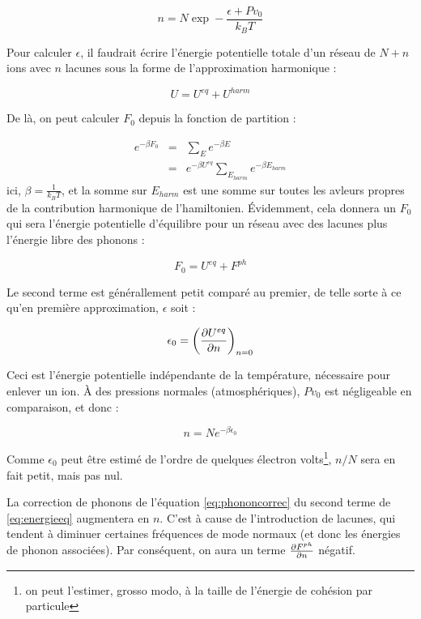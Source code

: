 \begin{equation}
    n = N \exp - \frac{\epsilon + P v_0}{k_B T}
    \label{eq:minimizgibbs}
\end{equation}

Pour calculer $\epsilon$, il faudrait écrire l'énergie potentielle totale d'un réseau de $N+n$ ions avec $n$ lacunes sous la forme de l'approximation harmonique :

\begin{equation}
    U = U^{eq} + U^{harm}
\end{equation}

De là, on peut calculer $F_0$ depuis la fonction de partition :

\begin{eqnarray}
    e^{-\beta F_0} & = & \sum_E e^{-\beta E}\\
    & = & e^{-\beta U^{eq}} \sum_{E_{harm}} e^{-\beta E_{harm}}
\end{eqnarray}
ici, $\beta = \frac{1}{k_B T}$, et la somme sur $E_{harm}$ est une somme sur toutes les avleurs propres de la contribution harmonique de l'hamiltonien. Évidemment, cela donnera un $F_0$ qui sera l'énergie potentielle d'équilibre pour un réseau avec des lacunes plus l'énergie libre des phonons :

\begin{equation}
    F_0 = U^{eq} + F^{ph}
    \label{eq:energieeq}
\end{equation}

Le second terme est générallement petit comparé au premier, de telle sorte à ce qu'en première approximation, $\epsilon$ soit :

\begin{equation}
    \epsilon_0 = \left( \frac{\partial U^{eq}}{\partial n} \right)_{n=0}
\end{equation}

Ceci est l'énergie potentielle indépendante de la température, nécessaire pour enlever un ion. À des pressions normales (atmosphériques), $P v_0$ est négligeable en comparaison, et donc :

\begin{equation}
    n = N e^{-\beta \epsilon_0}
    \label{eq:phononcorrec}
\end{equation}

Comme $\epsilon_0$ peut être estimé de l'ordre de quelques électron volts\footnote{on peut l'estimer, grosso modo, à la taille de l'énergie de cohésion par particule}, $n/N$ sera en fait petit, mais pas nul.

La correction de phonons de l'équation \ref{eq:phononcorrec} du second terme de \ref{eq:energieeq} augmentera en $n$. C'est à cause de l'introduction de lacunes, qui tendent à diminuer certaines fréquences de mode normaux (et donc les énergies de phonon associées). Par conséquent, on aura un terme $\frac{\partial F^{ph}}{\partial n}$ négatif.

